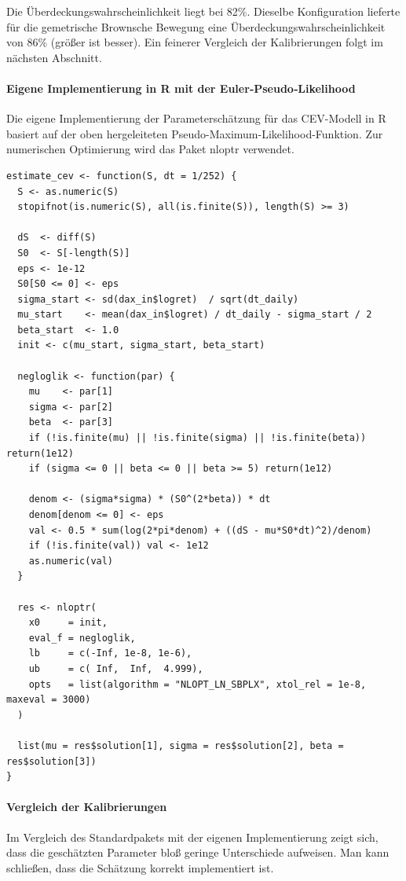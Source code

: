 Die Überdeckungswahrscheinlichkeit liegt bei 82\%. Dieselbe Konfiguration
lieferte für die gemetrische Brownsche Bewegung eine Überdeckungswahrscheinlichkeit von 86\% (größer ist besser).
Ein feinerer Vergleich der Kalibrierungen folgt im nächsten Abschnitt. 

\paragraph{Eigene Implementierung in R mit der Euler‑Pseudo‑Likelihood}
Die eigene Implementierung der Parameterschätzung für das CEV-Modell in R basiert auf der oben hergeleiteten Pseudo-Maximum-Likelihood-Funktion.
Zur numerischen Optimierung wird das Paket nloptr \cite{nlopt} verwendet.

\begin{lstlisting}
estimate_cev <- function(S, dt = 1/252) {
  S <- as.numeric(S)
  stopifnot(is.numeric(S), all(is.finite(S)), length(S) >= 3)
  
  dS  <- diff(S)
  S0  <- S[-length(S)]
  eps <- 1e-12
  S0[S0 <= 0] <- eps
  sigma_start <- sd(dax_in$logret)  / sqrt(dt_daily)
  mu_start    <- mean(dax_in$logret) / dt_daily - sigma_start / 2
  beta_start  <- 1.0
  init <- c(mu_start, sigma_start, beta_start) 
  
  negloglik <- function(par) {
    mu    <- par[1]
    sigma <- par[2]
    beta  <- par[3]
    if (!is.finite(mu) || !is.finite(sigma) || !is.finite(beta)) return(1e12)
    if (sigma <= 0 || beta <= 0 || beta >= 5) return(1e12)
    
    denom <- (sigma*sigma) * (S0^(2*beta)) * dt
    denom[denom <= 0] <- eps
    val <- 0.5 * sum(log(2*pi*denom) + ((dS - mu*S0*dt)^2)/denom)
    if (!is.finite(val)) val <- 1e12
    as.numeric(val)
  }
  
  res <- nloptr(
    x0     = init,
    eval_f = negloglik,
    lb     = c(-Inf, 1e-8, 1e-6),
    ub     = c( Inf,  Inf,  4.999),
    opts   = list(algorithm = "NLOPT_LN_SBPLX", xtol_rel = 1e-8, maxeval = 3000)
  )
  
  list(mu = res$solution[1], sigma = res$solution[2], beta = res$solution[3])
}
\end{lstlisting}

\paragraph{Vergleich der Kalibrierungen}
Im Vergleich des Standardpakets mit der eigenen Implementierung zeigt sich, dass die geschätzten Parameter bloß geringe Unterschiede aufweisen. Man kann schließen, dass die Schätzung korrekt implementiert ist.

